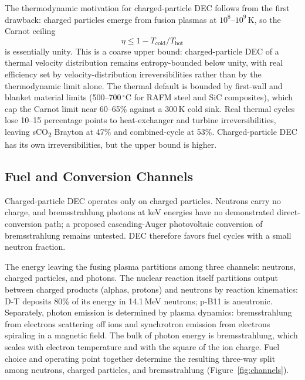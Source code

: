 \documentclass{article}
\begin{document}
The thermodynamic motivation for charged-particle DEC follows from
the first drawback: charged particles emerge from fusion plasmas at
$10^8$--$10^9$\,K, so the Carnot ceiling
\[
  \eta \leq 1 - T_\mathrm{cold}/T_\mathrm{hot}
\]
is essentially unity. This is a coarse upper bound: charged-particle
DEC of a thermal velocity distribution remains entropy-bounded below
unity, with real efficiency set by velocity-distribution
irreversibilities rather than by the thermodynamic limit alone.
The thermal default is bounded by first-wall and blanket material
limits (500--700\,$^\circ$C for RAFM steel and SiC composites),
which cap the Carnot limit near 60--65\% against a 300\,K cold sink.
Real thermal cycles lose 10--15 percentage points to heat-exchanger
and turbine irreversibilities, leaving sCO\textsubscript{2} Brayton
at 47\% and combined-cycle at 53\%. Charged-particle DEC has its
own irreversibilities, but the upper bound is higher.

\subsection{Fuel and Conversion Channels}
\label{sec:channels}

Charged-particle DEC operates only on charged particles. Neutrons
carry no charge, and bremsstrahlung photons at keV energies have no
demonstrated direct-conversion path; a proposed cascading-Auger
photovoltaic conversion of bremsstrahlung \citep{Binderbauer2018}
remains untested. DEC therefore favors fuel cycles with a small
neutron fraction.

The energy leaving the fusing plasma partitions among three channels:
neutrons, charged particles, and photons. The nuclear reaction itself
partitions output between charged products (alphas, protons) and
neutrons by reaction kinematics: D-T deposits
80\% of its energy in 14.1\,MeV neutrons; p-B11 is
aneutronic. Separately, photon emission is determined by 
plasma dynamics: bremsstrahlung from electrons scattering
off ions and synchrotron emission from electrons spiraling in a magnetic
field. The bulk of photon energy is bremsstrahlung, which scales with
electron temperature and with the square of the ion charge. Fuel
choice and operating point together determine the resulting
three-way split among neutrons, charged particles, and
bremsstrahlung (Figure~\ref{fig:channels}).
\end{document}
